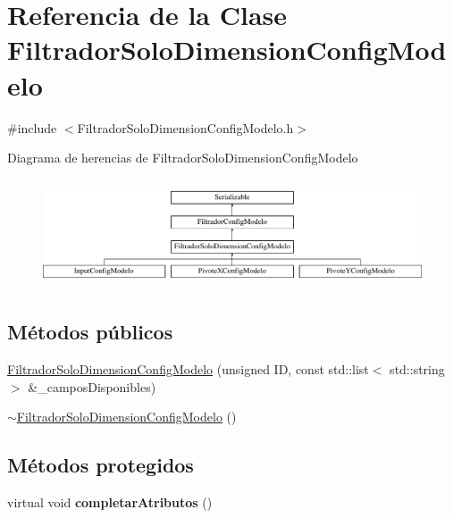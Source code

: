 \hypertarget{classFiltradorSoloDimensionConfigModelo}{\section{\-Referencia de la \-Clase \-Filtrador\-Solo\-Dimension\-Config\-Modelo}
\label{classFiltradorSoloDimensionConfigModelo}
}


{\ttfamily \#include $<$\-Filtrador\-Solo\-Dimension\-Config\-Modelo.\-h$>$}

\-Diagrama de herencias de \-Filtrador\-Solo\-Dimension\-Config\-Modelo\begin{figure}[H]
\begin{center}
\leavevmode
\includegraphics[height=3.246377cm]{classFiltradorSoloDimensionConfigModelo}
\end{center}
\end{figure}
\subsection*{\-Métodos públicos}
\begin{DoxyCompactItemize}
\item 
\hyperlink{classFiltradorSoloDimensionConfigModelo_a65e815f73bbd4d91c1027dd59da86f3f}{\-Filtrador\-Solo\-Dimension\-Config\-Modelo} (unsigned \-I\-D, const std\-::list$<$ std\-::string $>$ \&\-\_\-campos\-Disponibles)
\item 
\hyperlink{classFiltradorSoloDimensionConfigModelo_aa02479e5d24fcdcd65671916026e7f5f}{$\sim$\-Filtrador\-Solo\-Dimension\-Config\-Modelo} ()
\end{DoxyCompactItemize}
\subsection*{\-Métodos protegidos}
\begin{DoxyCompactItemize}
\item 
\hypertarget{classFiltradorSoloDimensionConfigModelo_a0f23a20ad58ab8b45333dcda5a964891}{virtual void {\bfseries completar\-Atributos} ()}\label{classFiltradorSoloDimensionConfigModelo_a0f23a20ad58ab8b45333dcda5a964891}

\end{DoxyCompactItemize}


